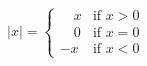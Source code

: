 \documentclass{article}
\begin{document}
\[
  |x| = 
    \begin{cases}
       \quad x & \text{if } x > 0 \\
       \quad 0 & \text{if } x = 0 \\
       -x & \text{if } x < 0
    \end{cases}
\]
\end{document}
